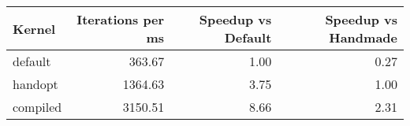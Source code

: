 \begin{tabular}{lrrr}
\toprule
Kernel & Iterations per ms & Speedup vs Default & Speedup vs Handmade \\
\midrule
default & 363.67 & 1.00 & 0.27 \\
handopt & 1364.63 & 3.75 & 1.00 \\
compiled & 3150.51 & 8.66 & 2.31 \\
\bottomrule
\end{tabular}
